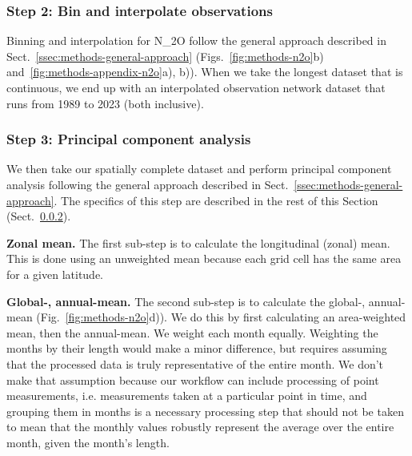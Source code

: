 \subsubsection{Step 2: Bin and interpolate observations}
\label{sssec:methods-n2o-bin-and-interpolate}

Binning and interpolation for N_2O
follow the general approach described in Sect.~\ref{ssec:methods-general-approach}
(Figs.~\ref{fig:methods-n2o}b) and~\ref{fig:methods-appendix-n2o}a), b)).
When we take the longest dataset that is continuous,
we end up with an interpolated observation network dataset that runs from 1989 to 2023 (both inclusive).

\subsubsection{Step 3: Principal component analysis}
\label{sssec:methods-n2o-pca}

We then take our spatially complete dataset and perform principal component analysis
following the general approach described in Sect.~\ref{ssec:methods-general-approach}.
The specifics of this step are described in the rest of this Section (Sect.~\ref{sssec:methods-n2o-pca}).

\textbf{Zonal mean.}
The first sub-step is to calculate the longitudinal (zonal) mean.
This is done using an unweighted mean because each grid cell has the same area for a given latitude.

\textbf{Global-, annual-mean.}
The second sub-step is to calculate the global-, annual-mean (Fig.~\ref{fig:methods-n2o}d)).
We do this by first calculating an area-weighted mean, then the annual-mean.
We weight each month equally.
Weighting the months by their length would make a minor difference,
but requires assuming that the processed data is truly representative of the entire month.
We don't make that assumption because our workflow can include processing of point measurements,
i.e. measurements taken at a particular point in time,
and grouping them in months is a necessary processing step
that should not be taken to mean
that the monthly values robustly represent the average over the entire month, given the month's length.

